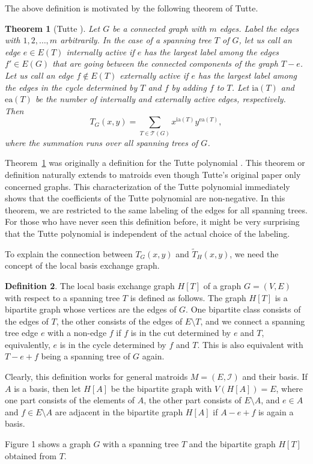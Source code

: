 \documentclass[12pt,a4paper]{amsart}
\numberwithin{equation}{section}
\theoremstyle{plain}
\newtheorem{Th}{Theorem}[section]
\theoremstyle{definition}
\newtheorem{Def}[Th]{Definition}
\newcommand{\1}{\textbf{1}}
\begin{document}
The above definition is motivated by the following theorem of Tutte.

\begin{Th}[Tutte \cite{tutte1954contribution}] \label{ia-ea-characterization}
Let $G$ be a connected graph with $m$ edges. Label the edges with $1,2,\dots,m$ arbitrarily. In the case of a spanning tree $T$ of $G$, let us call an edge $e\in E(T)$ internally active if $e$ has the largest label among the edges $f'\in E(G)$ that are going between the connected components of the graph $T-e$. Let us call an edge $f\notin E(T)$ externally active if $e$ has the largest label among the edges in the cycle determined by $T$ and $f$ by adding $f$ to $T$. Let $\mathrm{ia}(T)$ and $\mathrm{ea}(T)$ be the number of internally and externally active edges, respectively. Then
$$T_G(x,y)=\sum_{T\in \mathcal{T}(G)}x^{\mathrm{ia}(T)}y^{\mathrm{ea}(T)},$$
where the summation runs over all spanning trees of $G$.
\end{Th}

Theorem~\ref{ia-ea-characterization} was originally a definition for the Tutte polynomial \cite{tutte1954contribution}. This theorem or definition naturally extends to matroids even though Tutte's original paper only concerned graphs. This characterization of the Tutte polynomial immediately shows that the coefficients of the Tutte polynomial are non-negative. In this theorem, we are restricted to the same labeling of the edges for all spanning trees. For those who have never seen this definition before, it might be very surprising that the Tutte polynomial is independent of the actual choice of the labeling.

To explain the connection between $T_G(x,y)$ and $\widetilde{T}_H(x,y)$, we need the concept of the local basis exchange graph.

\begin{Def} The local basis exchange graph $H[T]$ of a graph $G=(V,E)$ with respect to a spanning tree  $T$ is defined as follows.
 The graph $H[T]$ is a bipartite graph whose vertices are the edges of $G$. One bipartite class consists of the edges of $T$, the other consists of the edges of $E\setminus T$, and we connect a spanning tree edge $e$ with a non-edge $f$ if $f$ is in the cut determined by $e$ and $T$, equivalently, $e$ is in the cycle determined by $f$ and $T$. This is also equivalent with $T-e+f$ being a spanning tree of $G$ again.
 
 Clearly, this definition works for general matroids $M=(E,\mathcal{I})$ and their basis. 
 If $A$ is a basis, then let $H[A]$ be the bipartite graph with $V(H[A])=E$,  where one part consists of the elements of $A$, the other part consists of $E\setminus A$, and $e\in A$ and $f\in E\setminus A$ are adjacent in the bipartite graph $H[A]$ if $A-e+f$ is again a basis.
\end{Def}
Figure 1 shows a graph $G$ with a spanning tree $T$ and the bipartite graph $H[T]$ obtained from $T$. 
\bigskip
\end{document}
